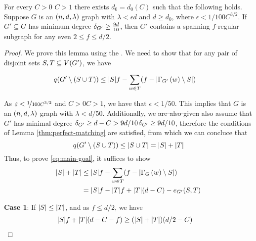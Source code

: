 \documentclass[11pt]{article}
\providecommand{\DIFadd}[1]{\textcolor{shin-ryoku}{#1}}%
\providecommand{\DIFdel}[1]{\textcolor{verylightgray}{\sout{#1}}}                      %
\providecommand{\DIFaddbegin}{} %
\providecommand{\DIFaddend}{} %
\providecommand{\DIFdelbegin}{} %
\providecommand{\DIFdelend}{} %
\begin{document}
\begin{lemma}\label{lemma:f-factor}
  For every \DIFdelbegin \DIFdel{$C > 0$ }\DIFdelend \DIFaddbegin \DIFadd{$C > 1$ }\DIFaddend there exists $d_0 = d_0(C)$ such that the following holds.
Suppose $G$ is an $\EnDeeLambda$ graph with $\lambda < \epsilon d$ and $d \ge d_0$, where $\epsilon < 1/100C^{3/2}$.
If $G' \subseteq G$ has minimum degree $\MinimalDegree{G'} \ge \frac{9d}{10}$, then $G'$ contains a spanning $f$-regular subgraph for any even $2 \le f \le d/2$.
\end{lemma}

\begin{proof}
  We prove this lemma using the .
  We need to show that for any pair of disjoint sets $S, T \subseteq \Vertices{G'}$, we have

  \begin{align}
    \OddComponents{G' \setminus (S \cup T)} &\le \Size{S}f - \sum_{w \in T} (f - \Size{\Neighbourhood{G'}{w} \setminus S}) \label{eq:main-goal}
  \end{align}

  As $\epsilon < \nicefrac{1}{100C^{3/2}}$ and \DIFdelbegin \DIFdel{$C > 0$}\DIFdelend \DIFaddbegin \DIFadd{$C > 1$}\DIFaddend , we have that $\epsilon < 1/50$.
This implies that $G$ is an $\EnDeeLambda$ graph with $\lambda < d/50$.
Additionally, we \DIFdelbegin \DIFdel{are also given }\DIFdelend \DIFaddbegin \DIFadd{also assume }\DIFaddend that $G'$ has minimal degree \DIFdelbegin \DIFdel{$\MinimalDegree{G'} \ge d - C >  9d/10$}\DIFdelend \DIFaddbegin \DIFadd{$\MinimalDegree{G'} \ge  9d/10$}\DIFaddend , therefore the conditions of Lemma \ref{thm:perfect-matching} are satisfied, from which we can concluce that $$\OddComponents{G' \setminus (S \cup T)} \le \Size{S \cup T} = |S| + |T|$$
Thus, to prove \eqref{eq:main-goal}, it suffices to show
  \begin{align}
    |S| + |T| &\le |S|f - \sum_{w \in T} (f - \Size{\Neighbourhood{G}{w} \setminus S})   \\
              &=\Size{S}f - \Size{T}f + \Size{T}(d-C) - \CutEdges{S}{T}{G'}  \label{eq:to-show}
  \end{align}  

  \textbf{Case 1}: If $\Size{S} \leq \Size{T}$, and as $f \leq d/2$, we have 
  \begin{align}
    \Size{S}f + \Size{T}(d-C-f)  &\ge (\Size{S} + \Size{T})(d/2 -C) \label{eq:to-show-1}
  \end{align}


\end{proof}
\end{document}
